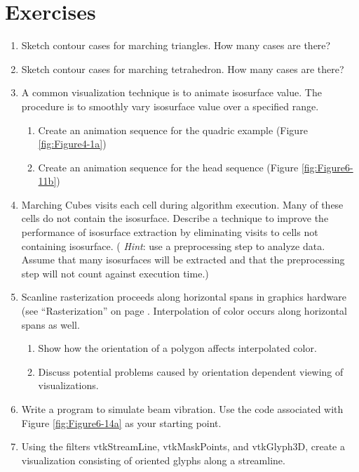 \section{Exercises}
\begin{enumerate}

\item Sketch contour cases for marching triangles. How many cases are there?

\item Sketch contour cases for marching tetrahedron. How many cases are there?

\item A common visualization technique is to animate isosurface value. The procedure is to smoothly vary isosurface value over a specified range.	
\begin{enumerate}
	\item Create an animation sequence for the quadric example (Figure \ref{fig:Figure4-1a})
	\item Create an animation sequence for the head sequence (Figure \ref{fig:Figure6-11b})
\end{enumerate}

\item Marching Cubes visits each cell during algorithm execution. Many of these cells do not contain the isosurface. Describe a technique to improve the performance of isosurface extraction by eliminating visits to cells not containing isosurface. ( \emph{Hint}: use a preprocessing step to analyze data. Assume that many isosurfaces will be extracted and that the preprocessing step will not count against execution time.)

\item Scanline rasterization proceeds along horizontal spans in graphics hardware (see ``Rasterization'' on page \pageref{subsec:rasterization}. Interpolation of color occurs along horizontal spans as well.
\begin{enumerate}
	\item Show how the orientation of a polygon affects interpolated color.
	\item Discuss potential problems caused by orientation dependent viewing of visualizations.
\end{enumerate}

\item Write a program to simulate beam vibration. Use the code associated with Figure \ref{fig:Figure6-14a} as your starting point.

\item 	 Using the filters vtkStreamLine, vtkMaskPoints, and vtkGlyph3D, create a visualization consisting of oriented glyphs along a streamline.


\end{enumerate}
